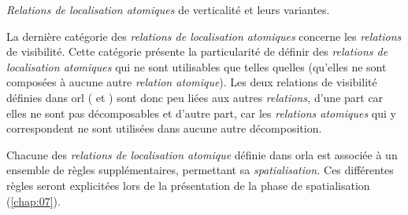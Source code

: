 \begin{table}
  \centering
  
  \caption{\emph{Relations de localisation atomiques} de verticalité
    et leurs variantes.}
  \label{tab:atomique_vertical}
\end{table}

La dernière catégorie des \emph{relations de localisation atomiques}
concerne les \emph{relations} de visibilité. Cette catégorie présente
la particularité de définir des \emph{relations de localisation
  atomiques} qui ne sont utilisables que telles quelles (\ie qu'elles
ne sont composées à aucune autre \emph{relation atomique}). Les deux
relations de visibilité définies dans \ac{orl} (\ie
{} et
) sont donc peu liées aux autres
\emph{relations,} d'une part car elles ne sont pas décomposables et
d'autre part, car les \emph{relations atomiques} qui y correspondent
ne sont utilisées dans aucune autre décomposition.

Chacune des \emph{relations de localisation atomique} définie dans
\ac{orla} est associée à un ensemble de règles supplémentaires,
permettant sa \emph{spatialisation.} Ces différentes règles seront
explicitées lors de la présentation de la phase de spatialisation
(\autoref{chap:07}).


